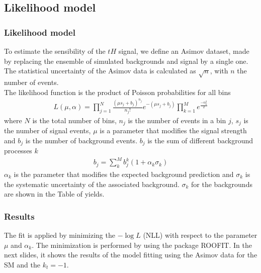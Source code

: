 \documentclass[11pt]{beamer}
\begin{document}
\begin{frame}
\subsection{Likelihood model}
\frametitle{Likelihood model}
\small{
To estimate the sensibility of the $tH$ signal, we define an Asimov dataset, made by replacing the ensemble of simulated backgrounds and signal by a single one. The statistical uncertainty of the Asimov data is calculated as $\sqrt{n}$, with $n$ the number of events.\\
The likelihood function is the product of Poisson probabilities for all bins
\begin{align}
	L(\mu,\alpha)=\prod_{j=1}^{N}\frac{(\mu s_j +b_j)^{n_j}}{n_j !}e^{-(\mu s_j+b_j)} \prod_{k=1}^M e^{\frac{-\alpha^2_k}{2}}
\end{align}
	where $N$ is the total number of bins, $n_j$ is the number of events in a bin $j$, $s_j$ is the number of signal events, $\mu$ is a parameter that modifies the signal strength and $b_j$ is the number of background events.
	$b_j$ is the sum of different background processes $k$
\begin{align}
b_j=\sum_k^M b_j^k(1+ \alpha_k \sigma_k)
\end{align}
$\alpha_k$ is the parameter that modifies the expected background prediction and $\sigma_k$ is the systematic uncertainty of the associated background. $\sigma_k$ for the backgrounds are shown in the Table of yields. }
\end{frame}


\begin{frame}
\frametitle{Results}
	The fit is applied by minimizing the $-\log{L}$ (NLL) with respect to the parameter $\mu$ and $\alpha_k$. The minimization is performed by using the package ROOFIT. In the next slides, it shows the results of the model fitting using the Asimov data for the SM and the $k_t=-1$.
\end{frame}
\end{document}

